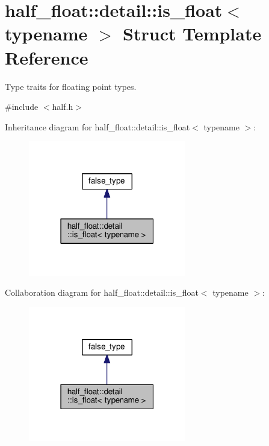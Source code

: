 \hypertarget{structhalf__float_1_1detail_1_1is__float}{}\section{half\+\_\+float\+:\+:detail\+:\+:is\+\_\+float$<$ typename $>$ Struct Template Reference}
\label{structhalf__float_1_1detail_1_1is__float}


Type traits for floating point types.  




{\ttfamily \#include $<$half.\+h$>$}



Inheritance diagram for half\+\_\+float\+:\+:detail\+:\+:is\+\_\+float$<$ typename $>$\+:
\nopagebreak
\begin{figure}[H]
\begin{center}
\leavevmode
\includegraphics[width=195pt]{structhalf__float_1_1detail_1_1is__float__inherit__graph}
\end{center}
\end{figure}


Collaboration diagram for half\+\_\+float\+:\+:detail\+:\+:is\+\_\+float$<$ typename $>$\+:
\nopagebreak
\begin{figure}[H]
\begin{center}
\leavevmode
\includegraphics[width=195pt]{structhalf__float_1_1detail_1_1is__float__coll__graph}
\end{center}
\end{figure}


